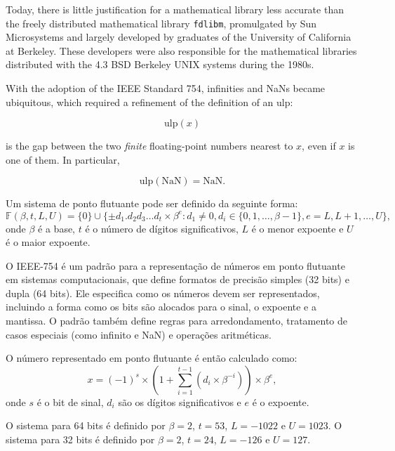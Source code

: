 Today, there is little justification for a mathematical library less accurate
than the freely distributed mathematical library \texttt{fdlibm}, promulgated
by Sun Microsystems and largely developed by graduates of the University of
California at Berkeley. These developers were also responsible for the
mathematical libraries distributed with the 4.3 BSD Berkeley UNIX systems
during the 1980s.

With the adoption of the IEEE Standard 754, infinities and NaNs became
ubiquitous, which required a refinement of the definition of an ulp:

\begin{equation}
  \mathrm{ulp}(x)
\end{equation}

is the gap between the two \textit{finite} floating-point numbers nearest to
$x$, even if $x$ is one of them. In particular,

\begin{equation}
  \mathrm{ulp}(\mathrm{NaN}) = \mathrm{NaN}.
\end{equation}

Um sistema de ponto flutuante pode ser definido da seguinte forma:
\begin{equation}
  \mathbb{F}(\beta, t, L, U) = \{0\} \cup \{\pm d_1.d_2d_3 \ldots d_t \times \beta^e : d_1 \neq 0, d_i \in \{0, 1, \ldots, \beta-1\}, e = L, L+1, \ldots, U\},
\end{equation}
onde $\beta$ é a base, $t$ é o número de dígitos significativos, $L$ é o menor expoente e $U$ é o maior expoente.

O IEEE-754 é um padrão para a representação de números em ponto flutuante em
sistemas computacionais, que define formatos de precisão simples (32 bits) e
dupla (64 bits). Ele especifica como os números devem ser representados,
incluindo a forma como os bits são alocados para o sinal, o expoente e a
mantissa. O padrão também define regras para arredondamento, tratamento de
casos especiais (como infinito e NaN) e operações aritméticas.

O número representado em ponto flutuante é então calculado como:
\begin{equation}
  x = (-1)^s \times (1 + \sum_{i=1}^{t-1} (d_i \times \beta^{-i})) \times \beta^e,
\end{equation}
onde $s$ é o bit de sinal, $d_i$ são os dígitos significativos e $e$ é o expoente.

O sistema para 64 bits é definido por $\beta = 2$, $t = 53$, $L = -1022$ e $U =
  1023$. O sistema para 32 bits é definido por $\beta = 2$, $t = 24$, $L = -126$
e $U = 127$.

